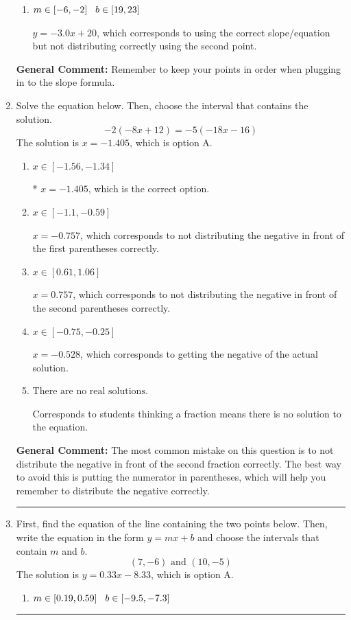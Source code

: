 \documentclass{extbook}[14pt]
\newcommand{\litem}[1]{\item #1

\rule{\textwidth}{0.4pt}}
\begin{document}
\begin{enumerate}
{\begin{enumerate}[label=\Alph*.]
 $y = -3.0x -8$, which corresponds to using the correct slope/equation but not distributing correctly using the first point.
\item \( m \in [-6, -2] \hspace*{3mm} b \in [19, 23] \)

 $y = -3.0x + 20$, which corresponds to using the correct slope/equation but not distributing correctly using the second point.
\end{enumerate}

\textbf{General Comment:} Remember to keep your points in order when plugging in to the slope formula.
}
\litem{
Solve the equation below. Then, choose the interval that contains the solution.
\[ -2(-8x + 12) = -5(-18x -16) \]The solution is \( x = -1.405 \), which is option A.\begin{enumerate}[label=\Alph*.]
\item \( x \in [-1.56, -1.34] \)

* $x = -1.405$, which is the correct option.
\item \( x \in [-1.1, -0.59] \)

$x = -0.757$, which corresponds to not distributing the negative in front of the first parentheses correctly.
\item \( x \in [0.61, 1.06] \)

$x = 0.757$, which corresponds to not distributing the negative in front of the second parentheses correctly.
\item \( x \in [-0.75, -0.25] \)

$x = -0.528$, which corresponds to getting the negative of the actual solution.
\item \( \text{There are no real solutions.} \)

Corresponds to students thinking a fraction means there is no solution to the equation.
\end{enumerate}

\textbf{General Comment:} The most common mistake on this question is to not distribute the negative in front of the second fraction correctly. The best way to avoid this is putting the numerator in parentheses, which will help you remember to distribute the negative correctly.
}
\litem{
First, find the equation of the line containing the two points below. Then, write the equation in the form $ y=mx+b $ and choose the intervals that contain $m$ and $b$.
\[ (7, -6) \text{ and } (10, -5) \]The solution is \( y = 0.33x -8.33 \), which is option A.\begin{enumerate}[label=\Alph*.]
\item \( m \in [0.19, 0.59] \hspace*{3mm} b \in [-9.5, -7.3] \)


\end{enumerate}}
\end{enumerate}
\end{document}
